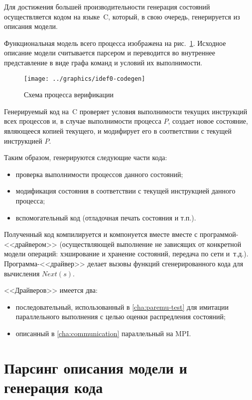 Для достижения большей производительности генерация состояний осуществляется кодом на
языке~C, который, в свою очередь, генерируется из описания модели.

Функциональная модель всего процесса изображена на рис.~\ref{fig:idef0-codegen}. Исходное
описание модели считывается парсером и переводится во внутреннее представление в виде
графа команд и условий их выполнимости.

\begin{figure}[ht]
  \centering
  \texttt{[image: ../graphics/idef0-codegen]}  
  \caption{Схема процесса верификации}
\label{fig:idef0-codegen}
\end{figure}

Генерируемый код на~C проверяет условия выполнимости текущих инструкций всех процессов и,
в случае выполнимости процесса $P$, создает новое состояние, являющееся копией текущего, и
модифирует его в соответствии с текущей инструкцией $P$.

Таким образом, генерируются следующие части кода:

\begin{itemize}
\item проверка выполнимости процессов данного состояний;
\item модификация состояния в соответствии с текущей инструкцией данного процесса;
\item вспомогательный код (отладочная печать состояния и т.п.).
\end{itemize}

Полученный код компилируется и компонуется вместе вместе с программой-<<драйвером>>
(осуществляющей выполнение не зависящих от конкретной модели операций: хэширование и
хранение состояний, передача по сети и~т.д.). Программа-<<драйвер>> делает вызовы функций
сгенерированного кода для вычисления $Next(s)$.

<<Драйверов>> имеется два: 

\begin{itemize}
\item последовательный, использованный в \ref{cha:paremu-test} для имитации параллельного
  выполнения с целью оценки распредления состояний;
\item описанный в \ref{cha:communication} параллельный на MPI.
\end{itemize}

\section{Парсинг описания модели и генерация кода}
\label{sec:promela-parser}

